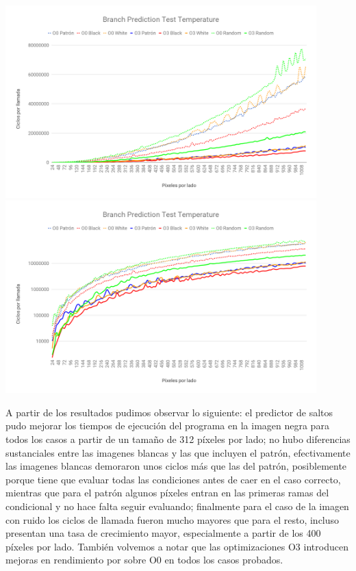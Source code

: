 \begin{center}

	\includegraphics[width=0.9\textwidth]{imagenes/branchprediction/branchpredictionLIN.png} \\
	\includegraphics[width=0.9\textwidth]{imagenes/branchprediction/branchpredictionLOG.png}

\end{center}

A partir de los resultados pudimos observar lo siguiente: el predictor de saltos pudo mejorar los tiempos de ejecución del programa en la imagen negra para todos los casos a partir de un tamaño de 312 píxeles por lado; no hubo diferencias sustanciales entre las imagenes blancas y las que incluyen el patrón, efectivamente las imagenes blancas demoraron unos ciclos más que las del patrón, posiblemente porque tiene que evaluar todas las condiciones antes de caer en el caso correcto, mientras que para el patrón algunos píxeles entran en las primeras ramas del condicional y no hace falta seguir evaluando; finalmente para el caso de la imagen con ruido los ciclos de llamada fueron mucho mayores que para el resto, incluso presentan una tasa de crecimiento mayor, especialmente a partir de los 400 píxeles por lado. También volvemos a notar que las optimizaciones O3 introducen mejoras en rendimiento por sobre O0 en todos los casos probados.


